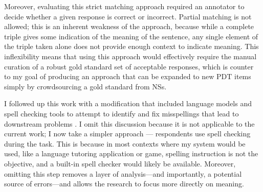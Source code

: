 Moreover, evaluating this strict matching approach required an annotator to decide whether a given response is correct or incorrect. Partial matching is not allowed; this is an inherent weakness of the approach, because while a complete triple gives some indication of the meaning of the sentence, any single element of the triple taken alone does not provide enough context to indicate meaning. This inflexibility means that using this approach would effectively require the manual curation of a robust gold standard set of acceptable responses, which is counter to my goal of producing an approach that can be expanded to new PDT items simply by crowdsourcing a gold standard from NSs.


I followed up this work with a modification that included language models and spell checking tools to attempt to identify and fix misspellings that lead to downstream problems \citep{king:dickinson:14}. I omit this discussion because it is not applicable to the current work; I now take a simpler approach --- respondents use spell checking during the task. This is because in most contexts where my system would be used, like a language tutoring application or game, spelling instruction is not the objective, and a built-in spell checker would likely be available. Moreover, omitting this step removes a layer of analysis---and importantly, a potential source of errors---and allows the research to focus more directly on meaning.




